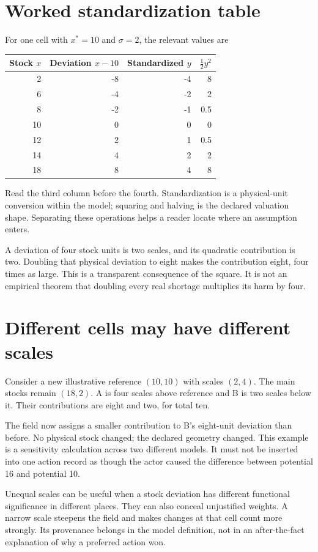 \section{Worked standardization table}
For one cell with \(x^*=10\) and \(\sigma=2\), the relevant values are
\begin{center}
\begin{tabular}{rrrr}
\toprule
Stock \(x\) & Deviation \(x-10\) & Standardized \(y\) & \(\tfrac12 y^2\)\\
\midrule
2 & -8 & -4 & 8\\
6 & -4 & -2 & 2\\
8 & -2 & -1 & 0.5\\
10 & 0 & 0 & 0\\
12 & 2 & 1 & 0.5\\
14 & 4 & 2 & 2\\
18 & 8 & 4 & 8\\
\bottomrule
\end{tabular}
\end{center}
Read the third column before the fourth. Standardization is a physical-unit conversion within the model; squaring and halving is the declared valuation shape. Separating these operations helps a reader locate where an assumption enters.

A deviation of four stock units is two scales, and its quadratic contribution is two. Doubling that physical deviation to eight makes the contribution eight, four times as large. This is a transparent consequence of the square. It is not an empirical theorem that doubling every real shortage multiplies its harm by four.

\section{Different cells may have different scales}
Consider a new illustrative reference \((10,10)\) with scales \((2,4)\). The main stocks remain \((18,2)\). A is four scales above reference and B is two scales below it. Their contributions are eight and two, for total ten.

The field now assigns a smaller contribution to B's eight-unit deviation than before. No physical stock changed; the declared geometry changed. This example is a sensitivity calculation across two different models. It must not be inserted into one action record as though the actor caused the difference between potential 16 and potential 10.

Unequal scales can be useful when a stock deviation has different functional significance in different places. They can also conceal unjustified weights. A narrow scale steepens the field and makes changes at that cell count more strongly. Its provenance belongs in the model definition, not in an after-the-fact explanation of why a preferred action won.

